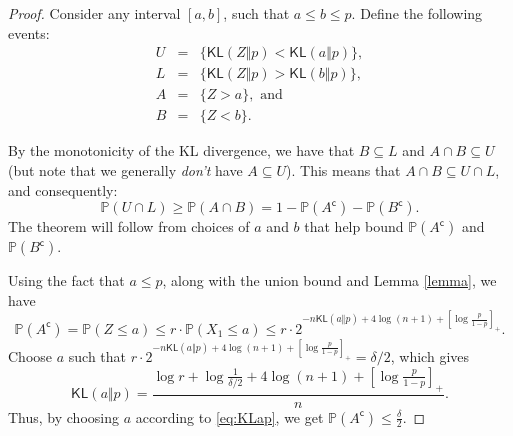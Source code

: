 \documentclass[12pt]{article}
\newcommand{\KL}{\textsf{KL}}
\newcommand{\comp}{\mathsf{c}}
\begin{document}
\begin{proof}
    Consider any interval $[a,b]$, such that $a\leq b\leq p$. Define the following events:
    \begin{eqnarray*}
        U &=& \{ \KL(Z\Vert p) < \KL(a\Vert p) \}, \\
        L &=& \{ \KL(Z\Vert p) > \KL(b\Vert p) \}, \\
        A &=& \{ Z > a \},\textrm{ and} \\
        B &=& \{ Z < b \}.
    \end{eqnarray*}
    \begin{center}
    \end{center}
    By the monotonicity of the KL divergence, we have that $B \subseteq L$ and $A \cap B \subseteq U$ (but note that we generally \emph{don't} have $A \subseteq U$). This means that $A \cap B \subseteq U \cap L$, and consequently:
    \[
        \mathbb{P}(U \cap L) \geq  \mathbb{P}(A \cap B)  = 1 - \mathbb{P}(A^\comp) - \mathbb{P}(B^\comp).
    \]
    The theorem will follow from choices of $a$ and $b$ that help bound $\mathbb{P}(A^\comp)$ and $\mathbb{P}(B^\comp)$.
    
    Using the fact that $a \leq p$, along with the union bound and Lemma \ref{lemma}, we have 
    \[
    \mathbb{P}(A^\comp) = \mathbb{P}(Z \leq a) \leq r \cdot\mathbb{P}(X_1 \leq a) \leq r \cdot 2^{-n\KL(a\Vert p) + 4\log (n+1) + \left[ \log \frac{p}{1-p} \right]_+}.
    \]
    Choose $a$ such that $r \cdot 2^{-n\KL(a\Vert p) + 4\log (n+1) + \left[ \log \frac{p}{1-p} \right]_+}=\delta/2$, which gives
    \begin{equation} \label{eq:KLap} 
    \KL(a\Vert p) = \frac{\log r + \log \frac{1}{\delta/2} + 4\log (n+1) + \left[ \log \frac{p}{1-p} \right]_+}{n}.
    \end{equation}
    Thus, by choosing $a$ according to \eqref{eq:KLap}, we get $\mathbb{P}(A^\comp) \leq \frac{\delta}{2}$.


\end{proof}
\end{document}
